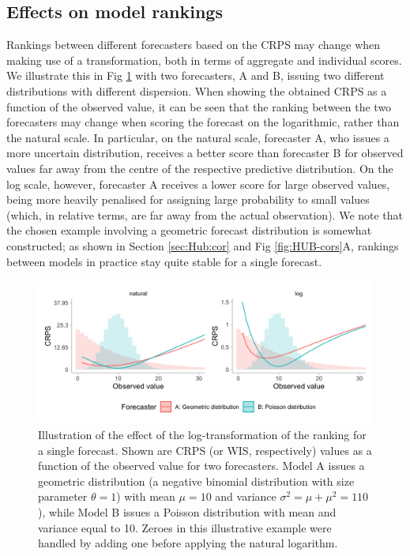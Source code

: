 \documentclass[10pt,letterpaper]{article}
\begin{document}
\subsection*{Effects on model rankings}
\label{sec:methods:rankings}
Rankings between different forecasters based on the CRPS may change when making use of a transformation, both in terms of aggregate and individual scores. We illustrate this in Fig \ref{fig:illustration-ranking} with two forecasters, A and B, issuing two different distributions with different dispersion. When showing the obtained CRPS as a function of the observed value, it can be seen that the ranking between the two forecasters may change when scoring the forecast on the logarithmic, rather than the natural scale. In particular, on the natural scale, forecaster A, who issues a more uncertain distribution, receives a better score than forecaster B for observed values far away from the centre of the respective predictive distribution. On the log scale, however, forecaster A receives a lower score for large observed values, being more heavily penalised for assigning large probability to small values (which, in relative terms, are far away from the actual observation). We note that the chosen example involving a geometric forecast distribution is somewhat constructed; as shown in Section \ref{sec:Hub:cor} and Fig \ref{fig:HUB-cors}A, rankings between models in practice stay quite stable for a single forecast. 


\begin{figure}[h!]
\centering
\includegraphics[width = 1\textwidth]{../output/figures/illustration-effect-log-ranking-crps.png}
\caption{Illustration of the effect of the log-transformation of the ranking for a single forecast. Shown are CRPS (or WIS, respectively) values as a function of the observed value for two forecasters. Model A issues a geometric distribution (a negative binomial distribution with size parameter $\theta = 1$) with mean $\mu = 10$ and variance $\sigma^2 = \mu + \mu^2 = 110$), while Model B issues a Poisson distribution with mean and variance equal to 10. Zeroes in this illustrative example were handled by adding one before applying the natural logarithm.}
\label{fig:illustration-ranking}
\end{figure}
\end{document}
